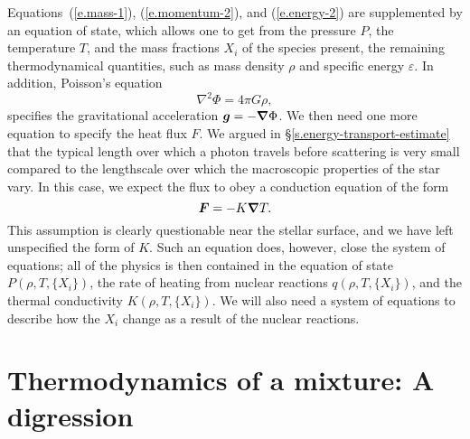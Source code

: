 Equations~(\ref{e.mass-1}), (\ref{e.momentum-2}), and (\ref{e.energy-2}) are supplemented by an equation of state, which allows one to get from the pressure $P$, the temperature $T$, and the mass fractions $X_{i}$ of the species present, the remaining thermodynamical quantities, such as mass density $\rho$ and specific energy $\varepsilon$. In addition, Poisson's equation
\begin{equation}\label{e.poisson}
\nabla^{2}\Phi = 4\pi G\rho,
\end{equation}
specifies the gravitational acceleration $\boldsymbol{g} = -\boldsymbol{\nabla}\Phi$. We then need one more equation to specify the heat flux $F$. We argued in \S\ref{s.energy-transport-estimate} that the typical length over which a photon travels before scattering is very small compared to the lengthscale over which the macroscopic properties of the star vary.  In this case, we expect the flux to obey a conduction equation of the form
\begin{equation}\label{e.conduction-simple}
\boldsymbol{F} = -K\boldsymbol{\nabla} T.
\end{equation}
This assumption is clearly questionable near the stellar surface, and we have left unspecified the form of $K$.  Such an equation does, however, close the system of equations; all of the physics is then contained in the equation of state $P(\rho,T,\{X_{i}\})$, the rate of heating from nuclear reactions $q(\rho, T, \{X_{i}\})$, and the thermal conductivity $K(\rho,T,\{X_{i}\})$.  We will also need a system of equations to describe how the $X_{i}$ change as a result of the nuclear reactions.

\section[Thermodynamics of a Mixture]{Thermodynamics of a mixture: A digression}\label{s.composition}
